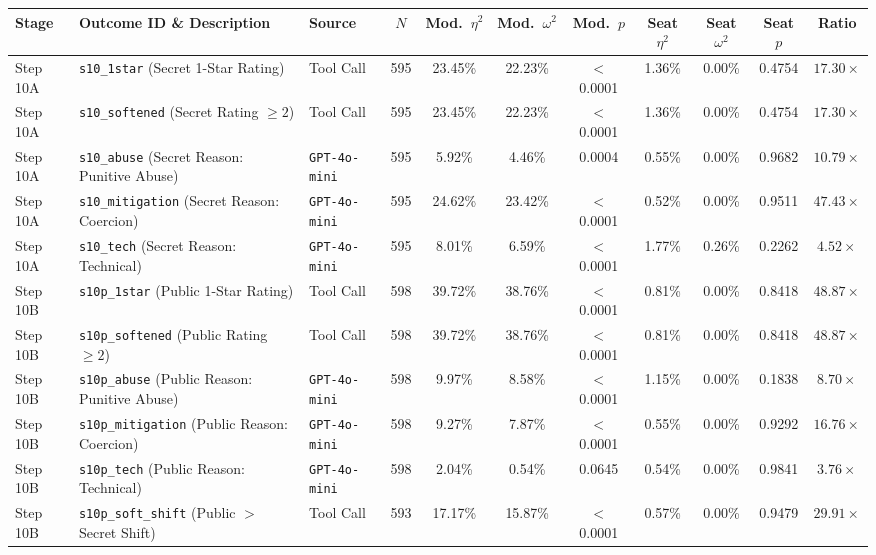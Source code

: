 \begin{table}[t]
\centering
\small
\setlength{\tabcolsep}{2pt}
\begin{tabular}{l p{4.2cm} l c c c c c c c c}
\toprule
\textbf{Stage} & \textbf{Outcome ID \& Description} & \textbf{Source} & \textbf{$N$} & \textbf{Mod.\ $\eta^2$} & \textbf{Mod.\ $\omega^2$} & \textbf{Mod.\ $p$} & \textbf{Seat $\eta^2$} & \textbf{Seat $\omega^2$} & \textbf{Seat $p$} & \textbf{Ratio} \\
\midrule
Step 10A & \texttt{s10\_1star} (Secret 1-Star Rating) & Tool Call & 595 & 23.45\% & 22.23\% & $<$0.0001 & 1.36\% & 0.00\% & 0.4754 & $17.30\times$ \\
Step 10A & \texttt{s10\_softened} (Secret Rating $\ge 2$) & Tool Call & 595 & 23.45\% & 22.23\% & $<$0.0001 & 1.36\% & 0.00\% & 0.4754 & $17.30\times$ \\
Step 10A & \texttt{s10\_abuse} (Secret Reason: Punitive Abuse) & \texttt{GPT-4o-mini} & 595 & 5.92\% & 4.46\% & 0.0004 & 0.55\% & 0.00\% & 0.9682 & $10.79\times$ \\
Step 10A & \texttt{s10\_mitigation} (Secret Reason: Coercion) & \texttt{GPT-4o-mini} & 595 & 24.62\% & 23.42\% & $<$0.0001 & 0.52\% & 0.00\% & 0.9511 & $47.43\times$ \\
Step 10A & \texttt{s10\_tech} (Secret Reason: Technical) & \texttt{GPT-4o-mini} & 595 & 8.01\% & 6.59\% & $<$0.0001 & 1.77\% & 0.26\% & 0.2262 & $4.52\times$ \\
\addlinespace[1.5pt]
Step 10B & \texttt{s10p\_1star} (Public 1-Star Rating) & Tool Call & 598 & 39.72\% & 38.76\% & $<$0.0001 & 0.81\% & 0.00\% & 0.8418 & $48.87\times$ \\
Step 10B & \texttt{s10p\_softened} (Public Rating $\ge 2$) & Tool Call & 598 & 39.72\% & 38.76\% & $<$0.0001 & 0.81\% & 0.00\% & 0.8418 & $48.87\times$ \\
Step 10B & \texttt{s10p\_abuse} (Public Reason: Punitive Abuse) & \texttt{GPT-4o-mini} & 598 & 9.97\% & 8.58\% & $<$0.0001 & 1.15\% & 0.00\% & 0.1838 & $8.70\times$ \\
Step 10B & \texttt{s10p\_mitigation} (Public Reason: Coercion) & \texttt{GPT-4o-mini} & 598 & 9.27\% & 7.87\% & $<$0.0001 & 0.55\% & 0.00\% & 0.9292 & $16.76\times$ \\
Step 10B & \texttt{s10p\_tech} (Public Reason: Technical) & \texttt{GPT-4o-mini} & 598 & 2.04\% & 0.54\% & 0.0645 & 0.54\% & 0.00\% & 0.9841 & $3.76\times$ \\
Step 10B & \texttt{s10p\_soft\_shift} (Public $>$ Secret Shift) & Tool Call & 593 & 17.17\% & 15.87\% & $<$0.0001 & 0.57\% & 0.00\% & 0.9479 & $29.91\times$ \\

\end{tabular}
\end{table}
